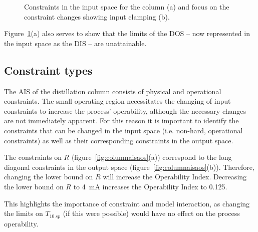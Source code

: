 \documentclass[final,authoryear,5pt,times,twocolumn]{elsarticle}
\begin{document}
\begin{figure}[htbp]
  \centering
    \scalebox{1}{}
    \endpgfgraphicnamed
    \scalebox{1}{}
    \endpgfgraphicnamed
  \caption{Constraints in the input space for the column (a) and focus on the constraint changes showing input clamping (b).}
  \label{fig:columnconsinput}
\end{figure}

Figure~\ref{fig:columnconsinput}(a) also serves to show that the limits of the DOS -- now represented in the input space as the DIS -- are unattainable.

\subsection{Constraint types}
The AIS of the distillation column consists of physical and operational constraints.
The small operating region necessitates the changing of input constraints to increase the process' operability, although the necessary changes are not immediately apparent.
For this reason it is important to identify the constraints that can be changed in the input space (i.e. non-hard, operational constraints) as well as their corresponding constraints in the output space.

The constraints on $R$ (figure~\ref{fig:columnaisaos}(a)) correspond to the long diagonal constraints in the output space (figure~\ref{fig:columnaisaos}(b)).
Therefore, changing the lower bound on $R$ will increase the Operability Index.
Decreasing the lower bound on $R$ to 4~mA increases the Operability Index to 0.125.

This highlights the importance of constraint and model interaction, as changing the limits on $T_{10~sp}$ (if this were possible) would have no effect on the process operability.
\end{document}
